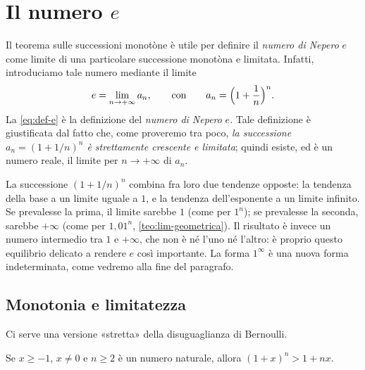 \section{Il numero $e$}
\label{sec:numero-e}

Il teorema sulle successioni monotòne è utile per definire il \emph{numero di Nepero}
$e$ come limite di una particolare successione monotòna e limitata. Infatti,
introduciamo tale numero mediante il limite
\begin{equation}\label{eq:def-e}
  e=\lim_{n\to+\infty}a_{n}, \qquad\text{con}\qquad a_{n}=\Bigl(1+\frac1n\Bigr)^{n}.
\end{equation}
La \eqref{eq:def-e} è la definizione del \emph{numero di Nepero} $e$.
Tale definizione è giustificata dal fatto che, come proveremo tra poco, \emph{la
successione $a_{n}=(1+1/n)^{n}$ è strettamente crescente e limitata}; quindi esiste, ed è
un numero reale, il limite per $n\to+\infty$ di $a_{n}$.

\begin{idea}
La successione $(1+1/n)^{n}$ combina fra loro due tendenze opposte: la tendenza della
base a un limite uguale a $1$, e la tendenza dell'esponente a un limite infinito. Se
prevalesse la prima, il limite sarebbe $1$ (come per $1^{n}$); se prevalesse la seconda,
sarebbe $+\infty$ (come per $1{,}01^{n}$, \cref{teo:lim-geometrica}). Il risultato è
invece un numero intermedio tra $1$ e $+\infty$, che non è né l'uno né l'altro: è
proprio questo equilibrio delicato a rendere $e$ così importante. La forma $1^{\infty}$ è
una nuova forma indeterminata, come vedremo alla fine del paragrafo.
\end{idea}

\subsection{Monotonia e limitatezza}

Ci serve una versione «stretta» della disuguaglianza di Bernoulli.

\begin{lemma}\label{lem:bernoulli-stretta}
Se $x\ge-1$, $x\neq0$ e $n\ge2$ è un numero naturale, allora $(1+x)^{n}>1+nx$.
\end{lemma}

\begin{schema}
\end{schema}

